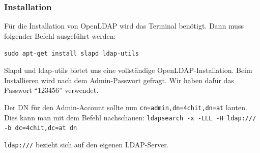 \subsubsection{Installation}
Für die Installation von OpenLDAP wird das Terminal benötigt. Dann muss folgender Befehl ausgeführt werden:

\verb|sudo apt-get install slapd ldap-utils|

Slapd und ldap-utils bietet uns eine vollständige OpenLDAP-Installation. Beim Installieren wird nach dem Admin-Passwort gefragt. Wir haben dafür das Passwort ``123456'' verwendet.

Der DN für den Admin-Account sollte nun \verb|cn=admin,dn=4chit,dn=at| lauten.
Dies kann man mit dem Befehl nachschauen:
\verb|ldapsearch -x -LLL -H ldap:/// -b dc=4chit,dc=at dn|

\verb|ldap:///| bezieht sich auf den eigenen LDAP-Server.

